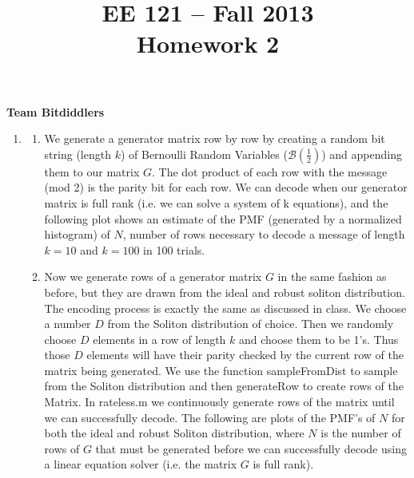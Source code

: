 \documentclass[11pt]{article}
\title{EE 121 -- Fall 2013\\Homework 2}
\begin{document}
\maketitle
\noindent\textbf{Team Bitdiddlers} \\

\begin{enumerate}


  \item
    \begin{enumerate}


        \item We generate a generator matrix row by row by creating a random bit string (length $k$) of Bernoulli Random Variables ($\mathcal{B}(\frac{1}{2})$) and appending them to our matrix $G$. The dot product of each row with the message (mod 2) is the parity bit for each row. We can decode when our generator matrix is full rank (i.e. we can solve a system of k equations), and the following plot shows an estimate of the PMF (generated by a normalized histogram) of $N$, number of rows necessary to decode a message of length $k=10$ and $k=100$ in 100 trials.



        \item Now we generate rows of a generator matrix $G$ in the same fashion as before, but they are drawn from the ideal and robust soliton distribution. The encoding process is exactly the same as discussed in class. We choose a number $D$ from the Soliton distribution of choice. Then we randomly choose $D$ elements in a row of length $k$ and choose them to be 1's. Thus those $D$ elements will have their parity checked by the current row of the matrix being generated. We use the function sampleFromDist to sample from the Soliton distribution and then generateRow to create rows of the Matrix. In rateless.m we continuously generate rows of the matrix until we can successfully decode. The following are plots of the PMF's of $N$ for both the ideal and robust Soliton distribution, where $N$ is the number of rows of $G$ that must be generated before we can successfully decode using a linear equation solver (i.e. the matrix $G$ is full rank).




\end{enumerate}
\end{enumerate}
\end{document}
